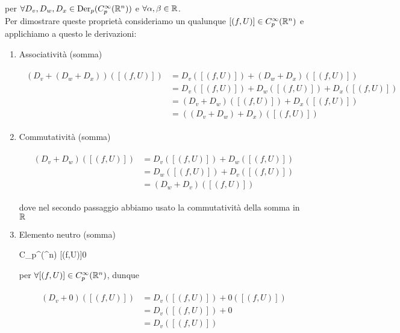 per $ \forall D_{v}, D_{w}, D_{x} \in \operatorname{Der}_{p}(C_{p}^{\infty}(\mathbb{R}^{n})) $ e $ \forall \alpha, \beta \in \mathbb{R} $.\\
Per dimostrare queste proprietà consideriamo un qualunque $ [(f,U)] \in C_{p}^{\infty}(\mathbb{R}^{n}) $ e applichiamo a questo le derivazioni:

\begin{enumerate}
	\item Associatività (somma)
	
		\begin{align}
			\begin{split}
				( D_{v} + (D_{w} + D_{x}) ) ([(f,U)]) &= D_{v} ([(f,U)]) + (D_{w} + D_{x}) ([(f,U)])\\
				&= D_{v} ([(f,U)]) + D_{w} ([(f,U)]) + D_{x} ([(f,U)])\\
				&= (D_{v} + D_{w}) ([(f,U)]) + D_{x} ([(f,U)])\\
				&= ( (D_{v} + D_{w}) + D_{x} ) ([(f,U)])
			\end{split}
		\end{align}
	
	\item Commutatività (somma)
	
		\begin{align}
			\begin{split}
				(D_{v} + D_{w}) ([(f,U)]) &= D_{v} ([(f,U)]) + D_{w} ([(f,U)])\\
				&= D_{w} ([(f,U)]) + D_{v} ([(f,U)])\\
				&= (D_{w} + D_{v}) ([(f,U)])
			\end{split}
		\end{align}
	
		dove nel secondo passaggio abbiamo usato la commutatività della somma in $ \mathbb{R} $
	
	\item Elemento neutro (somma)
	
			{C_{p}^{\infty}(\R^{n})}{\R}
			{[(f,U)]}{0}
			
		per $ \forall [(f,U)] \in C_{p}^{\infty}(\mathbb{R}^{n}) $, dunque
	
		\begin{align}
			\begin{split}
				(D_{v} + 0) ([(f,U)]) &= D_{v} ([(f,U)]) + 0 ([(f,U)])\\
				&= D_{v} ([(f,U)]) + 0\\
				&= D_{v} ([(f,U)])
			\end{split}
		\end{align}
	

\end{enumerate}
